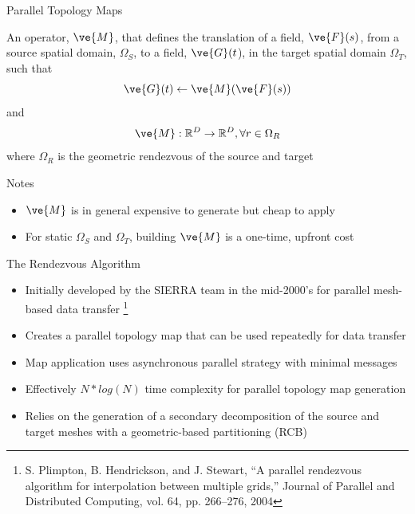 \documentclass{beamer}
\begin{document}
\begin{frame}{Parallel Topology Maps}
  
  An operator, $\ve{M}$, that defines the translation of a field,
  $\ve{F}(s)$, from a source spatial domain, $\Omega_S$, to a field,
  $\ve{G}(t$), in the target spatial domain $\Omega_T$, such that
  \[
  \ve{G}(t)\leftarrow \ve{M}(\ve{F}(s))
  \] 
  and 
  \[
  \ve{M}: \mathbb{R}^D \rightarrow \mathbb{R}^D, \forall r \in
  \Omega_R
  \]
  where $\Omega_R$ is the geometric rendezvous of the source and
  target
  \bigskip

  \begin{beamerboxesrounded}[upper=boxheadcolor,lower=boxbodycolor,shadow=true]
    {Notes}
    \begin{itemize}
    \item $\ve{M}$ is in general expensive to generate but cheap to
      apply
      \bigskip
    \item For static $\Omega_S$ and $\Omega_T$, building $\ve{M}$ is a
      one-time, upfront cost
    \end{itemize}
  \end{beamerboxesrounded}

\end{frame}

\begin{frame}{The Rendezvous Algorithm}

  \begin{itemize}
    \item Initially developed by the SIERRA team in the mid-2000's for
      parallel mesh-based data transfer \footnote{S. Plimpton,
        B. Hendrickson, and J. Stewart, “A parallel rendezvous
        algorithm for interpolation between multiple grids,” Journal
        of Parallel and Distributed Computing, vol. 64, pp. 266–276,
        2004}
      \medskip
    \item Creates a parallel topology map that can be used repeatedly
      for data transfer
    \item Map application uses asynchronous parallel strategy with
      minimal messages
    \item Effectively $N*log(N)$ time complexity for parallel topology
      map generation
      \medskip
    \item Relies on the generation of a secondary decomposition of the
      source and target meshes with a geometric-based partitioning
      (RCB)
  \end{itemize}

\end{frame}
\end{document}
